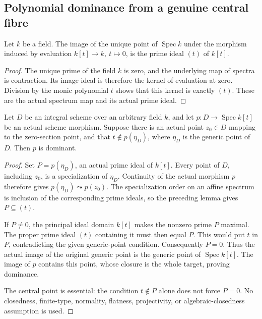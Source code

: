 \subsection{Polynomial dominance from a genuine central fibre}

\begin{lemma}\label{scheme:polynomial-zero-section-point-ideal}
\leanok
Let \(k\) be a field. The image of the unique point of \(\operatorname{Spec}k\)
under the morphism induced by evaluation \(k[t]\to k,\ t\mapsto0\), is the prime ideal
\((t)\) of \(k[t]\).
\end{lemma}
\begin{proof}
The unique prime of the field \(k\) is zero, and the underlying map of spectra is
contraction. Its image ideal is therefore the kernel of evaluation at zero.
Division by the monic polynomial \(t\) shows that this kernel is exactly \((t)\).
These are the actual spectrum map and its actual prime ideal.
\end{proof}

\begin{theorem}
\label{scheme:polynomial-dominance-central-point}
\leanok
{}
Let \(D\) be an integral scheme over an arbitrary field \(k\), and let
\(p:D\to\operatorname{Spec}k[t]\) be an actual scheme morphism. Suppose there is an
actual point \(z_0\in D\) mapping to the zero-section point, and that
\(t\notin p(\eta_D)\), where \(\eta_D\) is the generic point of \(D\).
Then \(p\) is dominant.
\end{theorem}
\begin{proof}
Set \(P=p(\eta_D)\), an actual prime ideal of \(k[t]\).
Every point of \(D\), including \(z_0\), is a specialization of \(\eta_D\).
Continuity of the actual morphism \(p\) therefore gives
\(p(\eta_D)\leadsto p(z_0)\). The specialization order on an affine spectrum is
inclusion of the corresponding prime ideals, so the preceding lemma gives
\(P\subseteq(t)\).

If \(P\ne0\), the principal ideal domain \(k[t]\) makes the nonzero prime \(P\)
maximal. The proper prime ideal \((t)\) containing it must then equal \(P\).
This would put \(t\) in \(P\), contradicting the given generic-point condition.
Consequently \(P=0\). Thus the actual image of the original generic point is
the generic point of \(\operatorname{Spec}k[t]\). The image of \(p\) contains
this point, whose closure is the whole target, proving dominance.

The central point is essential: the condition \(t\notin P\) alone does not
force \(P=0\). No closedness, finite-type, normality, flatness, projectivity,
or algebraic-closedness assumption is used.
\end{proof}

